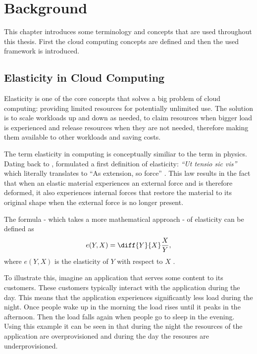 \chapter{Background}
\label{ch:background}

This chapter introduces some terminology and concepts that are used throughout this thesis. First the cloud computing concepts are defined and then the used framework is introduced.

\section{Elasticity in Cloud Computing}
\label{sec:elasticity}

Elasticity is one of the core concepts that solves a big problem of cloud computing: providing limited resources for potentially unlimited use. The solution is to scale workloads up and down as needed, to claim resources when bigger load is experienced and release resources when they are not needed, therefore making them available to other workloads and saving costs.

The term elasticity in computing is conceptually similiar to the term in physics. Dating back to \citeyear{hookLecturesPotentiaRestitutiva1678},  formulated a first definition of elasticity: \textit{``Ut tensio sic vis''} which literally translates to ``As extension, so force'' \cite{hookLecturesPotentiaRestitutiva1678}. This law results in the fact that when an elastic material experiences an external force and is therefore deformed, it also experiences internal forces that restore the material to its original shape when the external force is no longer present.

The formula - which takes a more mathematical approach - of elasticity can be defined as \[ e(Y, X) = \diff{Y}{X} \frac{X}{Y}, \] where \(e(Y, X)\) is the elasticity of \(Y\) with respect to \(X\) \cite{dustdarPrinciplesElasticProcesses2011}.

To illustrate this, imagine an application that serves some content to its customers. These customers typically interact with the application during the day. This means that the application experiences significantly less load during the night. Once people wake up in the morning the load rises until it peaks in the afternoon. Then the load falls again when people go to sleep in the evening. Using this example it can be seen in  that during the night the resources of the application are overprovisioned and during the day the resoures are underprovisioned.

